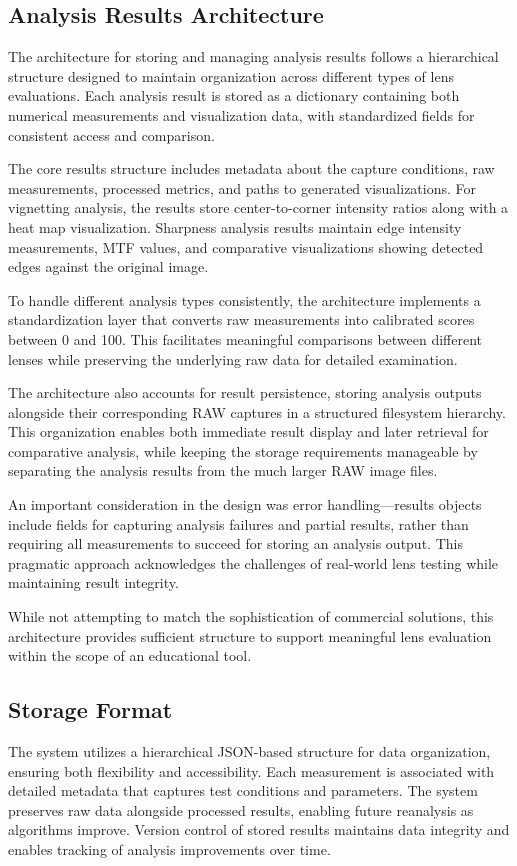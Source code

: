 \subsection{Analysis Results Architecture}
The architecture for storing and managing analysis results follows a hierarchical structure designed to maintain organization across different types of lens evaluations. Each analysis result is stored as a dictionary containing both numerical measurements and visualization data, with standardized fields for consistent access and comparison.

The core results structure includes metadata about the capture conditions, raw measurements, processed metrics, and paths to generated visualizations. For vignetting analysis, the results store center-to-corner intensity ratios along with a heat map visualization. Sharpness analysis results maintain edge intensity measurements, MTF values, and comparative visualizations showing detected edges against the original image.

To handle different analysis types consistently, the architecture implements a standardization layer that converts raw measurements into calibrated scores between 0 and 100. This facilitates meaningful comparisons between different lenses while preserving the underlying raw data for detailed examination.

The architecture also accounts for result persistence, storing analysis outputs alongside their corresponding RAW captures in a structured filesystem hierarchy. This organization enables both immediate result display and later retrieval for comparative analysis, while keeping the storage requirements manageable by separating the analysis results from the much larger RAW image files.

An important consideration in the design was error handling---results objects include fields for capturing analysis failures and partial results, rather than requiring all measurements to succeed for storing an analysis output. This pragmatic approach acknowledges the challenges of real-world lens testing while maintaining result integrity.

While not attempting to match the sophistication of commercial solutions, this architecture provides sufficient structure to support meaningful lens evaluation within the scope of an educational tool.

\subsection{Storage Format}
The system utilizes a hierarchical JSON-based structure for data organization, ensuring both flexibility and accessibility. Each measurement is associated with detailed metadata that captures test conditions and parameters. The system preserves raw data alongside processed results, enabling future reanalysis as algorithms improve. Version control of stored results maintains data integrity and enables tracking of analysis improvements over time.

